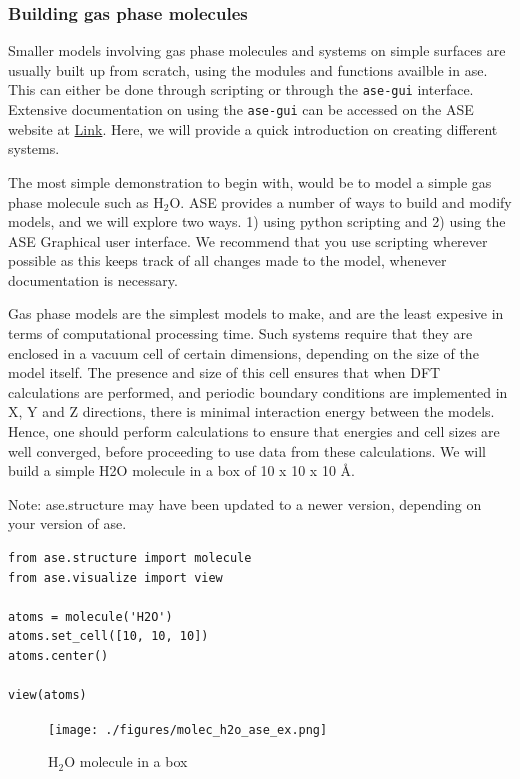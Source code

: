 \documentclass[11pt]{article}
\begin{document}
\subsubsection{Building gas phase molecules}
\label{sec-2-3-3}
Smaller models involving gas phase molecules and systems on simple surfaces are usually built up from scratch, using the modules and functions availble in ase. This can either be done through scripting or through the \texttt{ase-gui} interface. Extensive documentation on using the \texttt{ase-gui} can be accessed on the ASE website at \href{https://wiki.fysik.dtu.dk/ase/ase/gui/gui.html}{Link}. Here, we will provide a quick introduction on creating different systems.

The most simple demonstration to begin with, would be to model a simple gas phase molecule such as H$_{\text{2}}$O. ASE provides a number of ways to build and modify models, and we will explore two ways. 1) using python scripting and 2) using the ASE Graphical user interface. We recommend that you use scripting wherever possible as this keeps track of all changes made to the model, whenever documentation is necessary. 

Gas phase models are the simplest models to make, and are the least expesive in terms of computational processing time. Such systems require that they are enclosed in a vacuum cell of certain dimensions, depending on the size of the model itself. The presence and size of this cell ensures that when DFT calculations are performed, and periodic boundary conditions are implemented in X, Y and Z directions, there is minimal interaction energy between the models. Hence, one should perform calculations to ensure that energies and cell sizes are well converged, before proceeding to use data from these calculations.
We will build a simple H2O molecule in a box of 10 x 10 x 10 \AA{}. 

Note: ase.structure may have been updated to a newer version, depending on your version of ase.
\begin{verbatim}
from ase.structure import molecule
from ase.visualize import view

atoms = molecule('H2O')
atoms.set_cell([10, 10, 10])
atoms.center()

view(atoms)
\end{verbatim}

\begin{figure}[htb]
\centering
\texttt{[image: ./figures/molec\_h2o\_ase\_ex.png]}
\caption{H$_{\text{2}}$O molecule in a box}
\end{figure}
\end{document}
